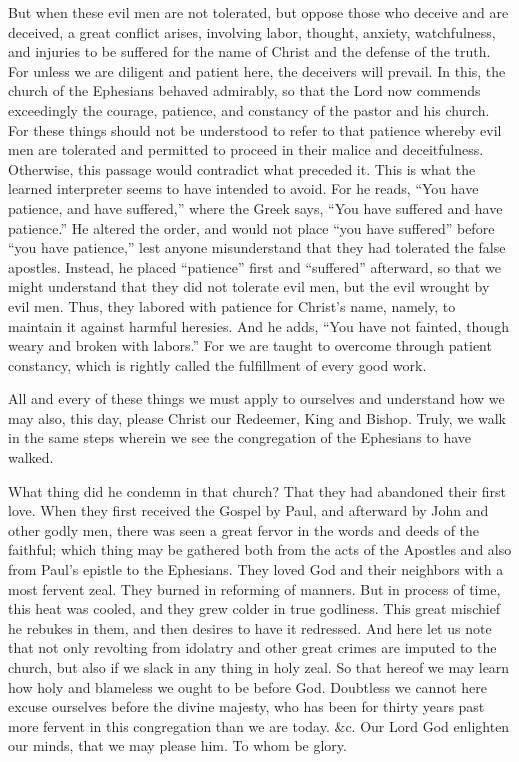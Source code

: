 But when these evil men are not tolerated, but oppose those who deceive and are deceived, a great conflict arises, involving labor, thought, anxiety, watchfulness, and injuries to be suffered for the name of Christ and the defense of the truth. For unless we are diligent and patient here, the deceivers will prevail. In this, the church of the Ephesians behaved admirably, so that the Lord now commends exceedingly the courage, patience, and constancy of the pastor and his church. For these things should not be understood to refer to that patience whereby evil men are tolerated and permitted to proceed in their malice and deceitfulness. Otherwise, this passage would contradict what preceded it. This is what the learned interpreter seems to have intended to avoid. For he reads, “You have patience, and have suffered,” where the Greek says, “You have suffered and have patience.” He altered the order, and would not place “you have suffered” before “you have patience,” lest anyone misunderstand that they had tolerated the false apostles. Instead, he placed “patience” first and “suffered” afterward, so that we might understand that they did not tolerate evil men, but the evil wrought by evil men. Thus, they labored with patience for Christ’s name, namely, to maintain it against harmful heresies. And he adds, “You have not fainted, though weary and broken with labors.” For we are taught to overcome through patient constancy, which is rightly called the fulfillment of every good work.

All and every of these things we must apply to ourselves and understand how we may also, this day, please Christ our Redeemer, King and Bishop. Truly, we walk in the same steps wherein we see the congregation of the Ephesians to have walked.

What thing did he condemn in that church? That they had abandoned their first love. When they first received the Gospel by Paul, and afterward by John and other godly men, there was seen a great fervor in the words and deeds of the faithful; which thing may be gathered both from the acts of the Apostles and also from Paul’s epistle to the Ephesians. They loved God and their neighbors with a most fervent zeal. They burned in reforming of manners. But in process of time, this heat was cooled, and they grew colder in true godliness. This great mischief he rebukes in them, and then desires to have it redressed. And here let us note that not only revolting from idolatry and other great crimes are imputed to the church, but also if we slack in any thing in holy zeal. So that hereof we may learn how holy and blameless we ought to be before God. Doubtless we cannot here excuse ourselves before the divine majesty, who has been for thirty years past more fervent in this congregation than we are today. \&c. Our Lord God enlighten our minds, that we may please him. To whom be glory.
